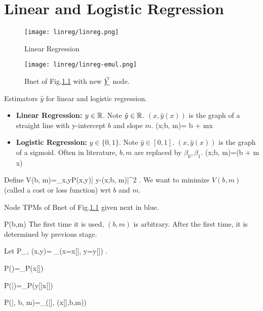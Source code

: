 \chapter{Linear and Logistic Regression}

\begin{figure}[h!]
\centering
\texttt{[image: linreg/linreg.png]}
\caption{Linear Regression} 
\label{fig-linreg}
\end{figure}

\begin{figure}[h!]
\centering
\texttt{[image: linreg/linreg-emul.png]}
\caption{Bnet of Fig.\ref{fig-linreg}  with new $\vec{\underline{Y}}$ node.}\label{fig-linreg-emul}
\end{figure}



Estimators $\hat{y}$ for linear and logistic regression.
\begin{itemize}
\item 

\textbf{Linear Regression:} $y\in { \mathbb{R}}$. 
Note $\hat{y}\in { \mathbb{R}}$. $(x,\hat{y}(x))$ is
the graph
of a straight line 
with y-intercept $b$ and slope $m$.
\beq
{}(x;b, m)= b + mx
\eeq

\item
\textbf{Logistic Regression:} $y\in\{0, 1\}$. Note $\hat{y}\in [0,1]$. $
(x,\hat{y}(x))$ is the graph
of a sigmoid.
 Often in literature, $b,m$ are replaced by $\beta_0, \beta_1$. 
\beq
{}(x;b, m)=\smoid(b + m x)
\eeq
\end{itemize}

Define
\beq
V(b, m)=\sum_{x,y}P(x,y)| y-(x;b, m)|^2
\;.\label{eq-norm-cost}
\eeq
We want to minimize $V(b,m)$ (called a cost or loss function) wrt $b$ and $m$.


Node TPMs of Bnet of Fig.\ref{fig-linreg}
given next in blue.

\beq\color{blue}
P(b,m) 
\eeq
The first time it is used, 
$(b,m)$ is arbitrary.
After the first time, it is determined 
by previous stage.

Let 
\beq
P_{\rvx, \rvy}(x,y)=
\sum_\sigma \indi(x=x[\sigma], y=y[\sigma])
\;.
\eeq

\beq\color{blue}
P(\vecx)=\prod_\sigma P(x[\sigma])
\eeq

\beq\color{blue}
P(\vecy|\vecx)=\prod_\sigma P(y[\sigma]\cond x[\sigma])
\eeq

\beq\color{blue}
P(|\vecx, b, m)=\prod_\sigma \delta([\sigma], (x[\sigma],b,m))
\label{eq-replace1}
\eeq

